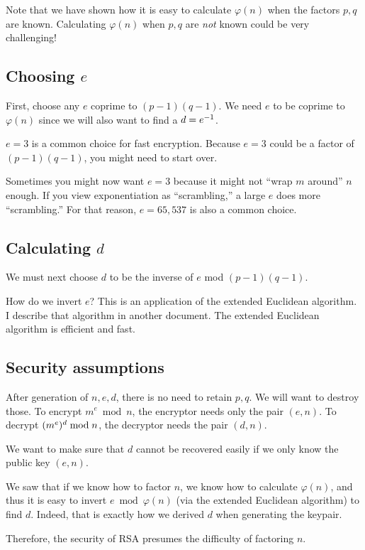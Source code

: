 \begin{remark}
  Note that we have shown how it is easy to calculate $\varphi(n)$ when
  the factors $p, q$ are known. Calculating $\varphi(n)$ when $p, q$ are
  \emph{not} known could be very challenging!
\end{remark}

\subsection{Choosing $e$}

First, choose any $e$ coprime to $(p - 1) (q - 1)$. We need $e$ to be
coprime to $\varphi(n)$ since we will also want to find a $d = {e}^{-1}$.

$e = 3$ is a common choice for fast encryption. Because $e = 3$ could be
a factor of $(p - 1)(q - 1)$, you might need to start over.

Sometimes you might now want $e = 3$ because it might not ``wrap $m$
around'' $n$ enough. If you view exponentiation as ``scrambling,'' a
large $e$ does more ``scrambling.'' For that reason, $e = 65,537$ is
also a common choice.

\subsection{Calculating $d$}

We must next choose $d$ to be the inverse of $e$ mod $(p - 1) (q - 1)$.

How do we invert $e$? This is an application of the extended Euclidean
algorithm. I describe that algorithm in another document. The extended
Euclidean algorithm is efficient and fast.

\subsection{Security assumptions}

\begin{remark}
  After generation of $n, e, d$, there is no need to retain $p, q$. We
  will want to destroy those. To encrypt $m^e \bmod n$, the encryptor
  needs only the pair $(e, n)$. To decrypt $\mathopen{}\left( {m^e} \right)\mathclose{}^d \bmod n$, the
  decryptor needs the pair $(d, n)$.
\end{remark}

\begin{remark}
  We want to make sure that $d$ cannot be recovered easily if we only
  know the public key $(e, n)$.

  We saw that if we know how to factor $n$, we know how to calculate
  $\varphi(n)$, and thus it is easy to invert $e \bmod \varphi(n)$ (via
  the extended Euclidean algorithm) to find $d$. Indeed, that is exactly
  how we derived $d$ when generating the keypair.

  Therefore, the security of RSA presumes the difficulty of factoring
  $n$.
\end{remark}

